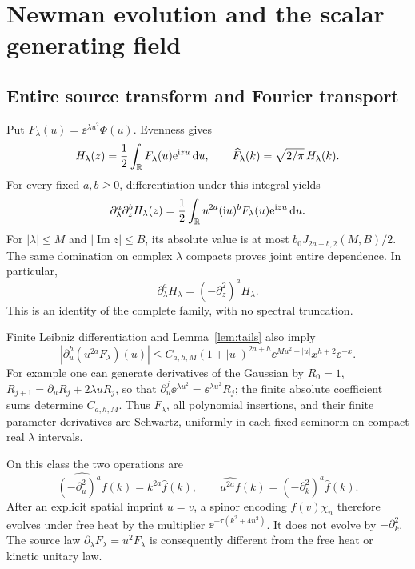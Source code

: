\section{Newman evolution and the scalar generating field}\label{sec:newman}

\subsection{Entire source transform and Fourier transport}
Put $F_\lambda(u)=\ee^{\lambda u^2}\Phi(u)$. Evenness gives
\begin{equation}\label{eq:fullH}
 H_\lambda(z)=\frac12\int_\mathbb R F_\lambda(u)\mathrm e^{\mathrm i zu}\,\mathrm d u,
 \qquad \widehat F_\lambda(k)=\sqrt{2/\pi}\,H_\lambda(k).
\end{equation}
For every fixed $a,b\ge0$, differentiation under this integral yields
\begin{equation}\label{eq:mixedH}
 \partial_\lambda^a\partial_z^bH_\lambda(z)
 =\frac12\int_\mathbb R u^{2a}(\mathrm i u)^bF_\lambda(u)\mathrm e^{\mathrm i zu}\,\mathrm d u.
\end{equation}
For $|\lambda|\le M$ and $|\operatorname{Im}z|\le B$, its absolute
value is at most $b_0J_{2a+b,2}(M,B)/2$. The same domination on complex
$\lambda$ compacts proves joint entire dependence. In particular,
\begin{equation}\label{eq:newmanPDE}
 \partial_\lambda^aH_\lambda=(-\partial_z^2)^aH_\lambda.
\end{equation}
This is an identity of the complete family, with no spectral truncation.

Finite Leibniz differentiation and Lemma~\ref{lem:tails} also imply
\begin{equation}\label{eq:Schwartzbound}
 |\partial_u^h(u^{2a}F_\lambda)(u)|
 \le C_{a,h,M}(1+|u|)^{2a+h}
 \ee^{Mu^2+|u|}x^{h+2}\ee^{-x}.
\end{equation}
For example one can generate derivatives of the Gaussian by
$R_0=1$, $R_{j+1}=\partial_uR_j+2\lambda uR_j$, so that
$\partial_u^j\ee^{\lambda u^2}=\ee^{\lambda u^2}R_j$;
the finite absolute coefficient sums determine $C_{a,h,M}$.
Thus $F_\lambda$, all polynomial insertions, and their finite parameter
derivatives are Schwartz, uniformly in each fixed seminorm on compact
real $\lambda$ intervals.

On this class the two operations are
\begin{equation}\label{eq:kineticvsnewman}
 \widehat{(-\partial_u^2)^af}(k)=k^{2a}\widehat f(k),\qquad
 \widehat{u^{2a}f}(k)=(-\partial_k^2)^a\widehat f(k).
\end{equation}
After an explicit spatial imprint $u=v$, a spinor encoding $f(v)\chi_n$
therefore evolves under free heat by the multiplier
$\ee^{-\tau(k^2+4n^2)}$. It does not evolve by
$-\partial_k^2$. The source law $\partial_\lambda F_\lambda=u^2F_\lambda$
is consequently different from the free heat or kinetic unitary law.

